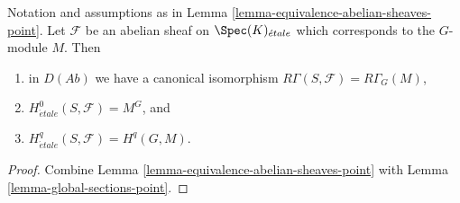 \begin{lemma}
\label{lemma-compare-cohomology-point}
Notation and assumptions as in
Lemma \ref{lemma-equivalence-abelian-sheaves-point}.
Let $\mathcal{F}$ be an abelian sheaf on $\Spec(K)_{\acute{e}tale}$
which corresponds to the $G$-module $M$.
Then
\begin{enumerate}
\item in $D(\textit{Ab})$ we have a canonical isomorphism
$R\Gamma(S, \mathcal{F}) = R\Gamma_G(M)$,
\item $H_{\acute{e}tale}^0(S, \mathcal{F}) = M^G$, and
\item $H_{\acute{e}tale}^q(S, \mathcal{F}) = H^q(G, M)$.
\end{enumerate}
\end{lemma}

\begin{proof}
Combine
Lemma \ref{lemma-equivalence-abelian-sheaves-point}
with
Lemma \ref{lemma-global-sections-point}.
\end{proof}

